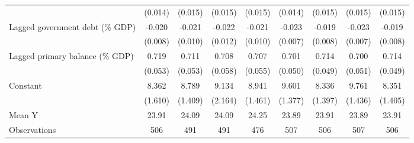 {\begin{tabular}{l*{8}{c}}
                    &     (0.014)         &     (0.015)         &     (0.015)         &     (0.015)         &     (0.014)         &     (0.015)         &     (0.015)         &     (0.015)         \\
\addlinespace
Lagged government debt (\% GDP)&      -0.020\sym{**} &      -0.021\sym{**} &      -0.022\sym{*}  &      -0.021\sym{**} &      -0.023\sym{***}&      -0.019\sym{**} &      -0.023\sym{***}&      -0.019\sym{**} \\
                    &     (0.008)         &     (0.010)         &     (0.012)         &     (0.010)         &     (0.007)         &     (0.008)         &     (0.007)         &     (0.008)         \\
\addlinespace
Lagged primary balance (\% GDP)&       0.719\sym{***}&       0.711\sym{***}&       0.708\sym{***}&       0.707\sym{***}&       0.701\sym{***}&       0.714\sym{***}&       0.700\sym{***}&       0.714\sym{***}\\
                    &     (0.053)         &     (0.053)         &     (0.058)         &     (0.055)         &     (0.050)         &     (0.049)         &     (0.051)         &     (0.049)         \\
\addlinespace
Constant            &       8.362\sym{***}&       8.789\sym{***}&       9.134\sym{***}&       8.941\sym{***}&       9.601\sym{***}&       8.336\sym{***}&       9.761\sym{***}&       8.351\sym{***}\\
                    &     (1.610)         &     (1.409)         &     (2.164)         &     (1.461)         &     (1.377)         &     (1.397)         &     (1.436)         &     (1.405)         \\
\midrule
Mean Y              &       23.91         &       24.09         &       24.09         &       24.25         &       23.89         &       23.91         &       23.89         &       23.91         \\
Observations        &         506         &         491         &         491         &         476         &         507         &         506         &         507         &         506         \\
\bottomrule
\end{tabular}
}
